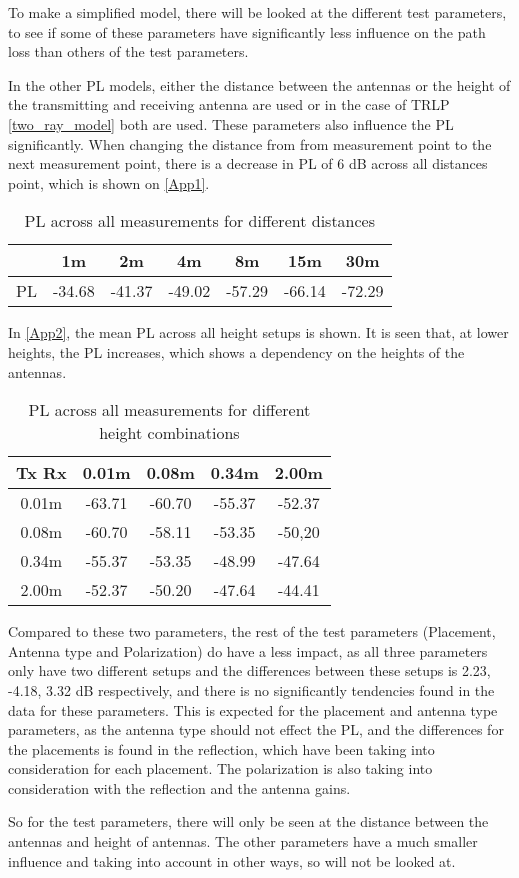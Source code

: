 To make a simplified model, there will be looked at the different test parameters, to see if some of these parameters have significantly less influence on the path loss than others of the test parameters.

In the other PL models, either the distance between the antennas or the height of the transmitting and receiving antenna are used or in the case of TRLP \eqref{two_ray_model} both are used. These parameters also influence the PL significantly. When changing the distance from from measurement point to the next measurement point, there is a decrease in PL of 6 dB across all distances point, which is shown on \autoref{App1}.

\begin{table}[!htbp]
\centering
\begin{tabular}{|c|c|c|c|c|c|c|}
\hline
   & 1m & 2m & 4m & 8m & 15m & 30m\\
\hline
PL & -34.68 & -41.37 & -49.02 & -57.29 & -66.14 & -72.29 \\
\hline
\end{tabular}
\label{App1}
\caption{PL across all measurements for different distances}
\end{table}



In \autoref{App2}, the mean PL across all height setups is shown. It is seen that, at lower heights, the PL increases, which shows a dependency on the heights of the antennas.

\begin{table}[!htbp]
\centering
\begin{tabular}{|c|c|c|c|c|}
\hline
Tx Rx & 0.01m & 0.08m & 0.34m & 2.00m \\
\hline
0.01m & -63.71 & -60.70 & -55.37 & -52.37\\
\hline
0.08m & -60.70 & -58.11 & -53.35 & -50,20\\
\hline
0.34m & -55.37 & -53.35 & -48.99 & -47.64\\
\hline
2.00m & -52.37 & -50.20 & -47.64 & -44.41\\
\hline
\end{tabular}
\caption{PL across all measurements for different height combinations}
\label{App2}
\end{table}

Compared to these two parameters, the rest of the test parameters (Placement, Antenna type and Polarization) do have a less impact, as all three parameters only have two different setups and the differences between these setups is 2.23, -4.18, 3.32 dB respectively, and there is no significantly tendencies found in the data for these parameters. This is expected for the placement and antenna type parameters, as the antenna type should not effect the PL, and the differences for the placements is found in the reflection, which have been taking into consideration for each placement. The polarization is also taking into consideration with the reflection and the antenna gains.

So for the test parameters, there will only be seen at the distance between the antennas and height of antennas. The other parameters have a much smaller influence and taking into account in other ways, so will not be looked at.
